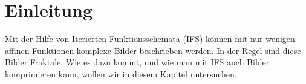 %
%
%
\section{Einleitung \label{ifs:section:teil0}}
Mit der Hilfe von Iterierten Funktionsschemata (IFS) können mit nur wenigen affinen Funktionen komplexe Bilder beschrieben werden.
In der Regel sind diese Bilder Fraktale.
Wie es dazu kommt, und wie man mit IFS auch Bilder komprimieren kann, wollen wir in diesem Kapitel untersuchen.


